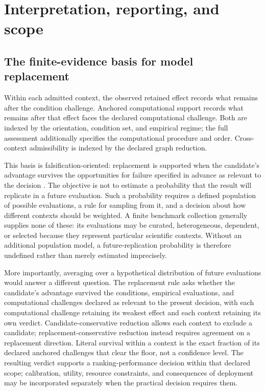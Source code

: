 \documentclass[11pt]{article}
\theoremstyle{remark}
\begin{document}
\section{Interpretation, reporting, and scope}
\label{sec:discussion}

\subsection{The finite-evidence basis for model replacement}

Within each admitted context, the observed retained effect records what remains
after the condition challenge. Anchored computational support records what
remains after that effect faces the declared computational challenge. Both are
indexed by the orientation, condition set, and empirical regime; the full
assessment additionally specifies the computational procedure and order.
Cross-context admissibility is indexed by the declared graph reduction.

This basis is falsification-oriented: replacement is supported when the
candidate's advantage survives the opportunities for failure specified in
advance as relevant to the decision
\cite{popper1959logic,popper1963conjectures}. The objective is not to estimate
a probability that the result will replicate in a future evaluation. Such a
probability requires a defined population of possible evaluations, a rule for
sampling from it, and a decision about how different contexts should be
weighted. A finite benchmark collection generally supplies none of these:
its evaluations may be curated, heterogeneous, dependent, or selected because
they represent particular scientific contexts. Without an additional
population model, a future-replication probability is therefore undefined
rather than merely estimated imprecisely.

More importantly, averaging over a hypothetical distribution of future
evaluations would answer a different question. The replacement rule asks
whether the candidate's advantage survived the conditions, empirical
evaluations, and computational challenges declared as relevant to the present
decision, with each computational challenge retaining its weakest effect and each
context retaining its own verdict. Candidate-conservative reduction allows
each context to exclude a candidate; replacement-conservative reduction instead
requires agreement on a replacement direction. Literal survival within a
context is the exact fraction of its declared anchored challenges that clear
the floor, not a confidence level. The resulting verdict
supports a ranking-performance decision within that declared scope;
calibration, utility, resource constraints, and consequences of deployment may
be incorporated separately when the practical decision requires them.
\end{document}
